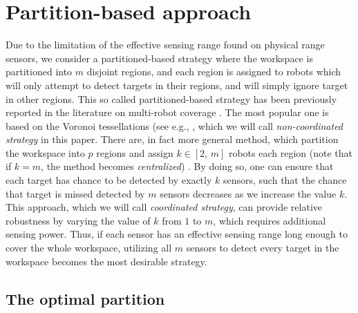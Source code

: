 \documentclass[journal]{IEEEtran}
\begin{document}
\section{Partition-based approach}
\label{sec:sec4}
Due to the limitation of the effective sensing range found on physical range sensors, we consider a partitioned-based strategy where the workspace is partitioned into $m$ disjoint regions, and each region is assigned to robots which will only attempt to detect targets in their regions, and will simply ignore target in other regions. This so called partitioned-based strategy has been previously reported in the literature on multi-robot coverage \cite{cortes_coverage_2004,hutchinson_robust_2012,schwager2009decentralized,park2014robust}. The most popular one is based on the Voronoi tessellations (see e.g., \cite{cortes_coverage_2004}, which we will call \emph{non-coordinated strategy} in this paper.
There are, in fact more general method, which partition the workspace into $p$ regions and assign $k \in [2,\,m]$ robots each region (note that if $k=m$, the method becomes \emph{centralized}) \cite{hutchinson_robust_2012}. By doing so, one can ensure that each target has chance to be detected by exactly $k$ sensors, such that the chance that target is missed detected by $m$ sensors decreases as we increase the value $k$. This approach, which we will call \emph{coordinated strategy}, can provide relative robustness by varying the value of $k$ from $1$ to $m$, which requires additional sensing power. Thus, if each sensor has an effective sensing range long enough to cover the whole workspace, utilizing all $m$ sensors to detect every target in the workspace becomes the most desirable strategy.



\subsection{The optimal partition}
\end{document}
